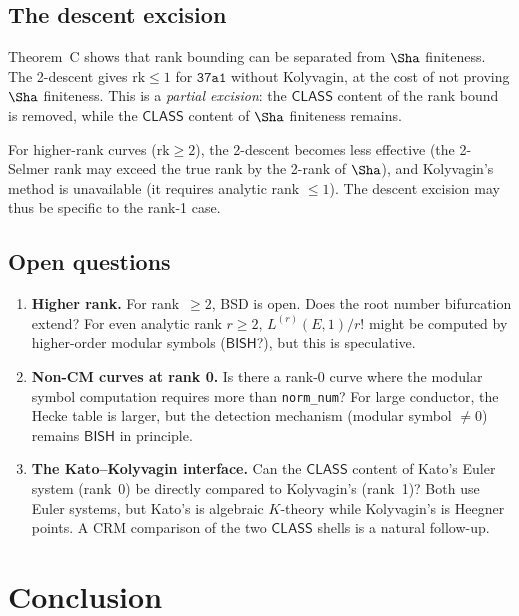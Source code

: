 \documentclass[11pt]{article}
\theoremstyle{plain}
\theoremstyle{definition}
\theoremstyle{remark}
\newcommand{\rk}{\mathrm{rk}}
\newcommand{\BISH}{\ensuremath{\mathsf{BISH}}}
\newcommand{\CLASS}{\ensuremath{\mathsf{CLASS}}}
\begin{document}
\subsection{The descent excision}

Theorem~C shows that rank bounding can be separated from $\Sha$ finiteness. The 2-descent gives $\rk \leq 1$ for $\texttt{37a1}$ without Kolyvagin, at the cost of not proving $\Sha$ finiteness. This is a \emph{partial excision}: the $\CLASS$ content of the rank bound is removed, while the $\CLASS$ content of $\Sha$ finiteness remains.

For higher-rank curves ($\rk \geq 2$), the 2-descent becomes less effective (the 2-Selmer rank may exceed the true rank by the 2-rank of $\Sha$), and Kolyvagin's method is unavailable (it requires analytic rank $\leq 1$). The descent excision may thus be specific to the rank-1 case.

\subsection{Open questions}

\begin{enumerate}[nosep]
\item \textbf{Higher rank.} For rank~$\geq 2$, BSD is open. Does the root number bifurcation extend? For even analytic rank $r \geq 2$, $L^{(r)}(E,1)/r!$ might be computed by higher-order modular symbols ($\BISH$?), but this is speculative.
\item \textbf{Non-CM curves at rank 0.} Is there a rank-0 curve where the modular symbol computation requires more than \texttt{norm\_num}? For large conductor, the Hecke table is larger, but the detection mechanism (modular symbol $\neq 0$) remains $\BISH$ in principle.
\item \textbf{The Kato--Kolyvagin interface.} Can the $\CLASS$ content of Kato's Euler system (rank~0) be directly compared to Kolyvagin's (rank~1)? Both use Euler systems, but Kato's is algebraic $K$-theory while Kolyvagin's is Heegner points. A CRM comparison of the two $\CLASS$ shells is a natural follow-up.
\end{enumerate}


\section{Conclusion}
\label{sec:conclusion}
\end{document}

